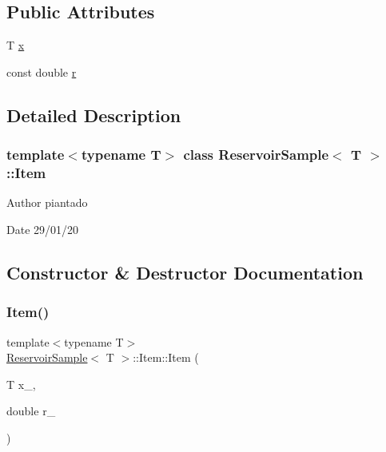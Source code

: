 \subsection*{Public Attributes}
\begin{DoxyCompactItemize}
\item 
T \hyperlink{struct_reservoir_sample_1_1_item_abc1ea374480d6d86d0466e4683c98337}{x}
\item 
const double \hyperlink{struct_reservoir_sample_1_1_item_ad74b6fb33eb3a534eeb4141c735dfaf5}{r}
\end{DoxyCompactItemize}


\subsection{Detailed Description}
\subsubsection*{template$<$typename T$>$\newline
class Reservoir\+Sample$<$ T $>$\+::\+Item}

\begin{DoxyAuthor}{Author}
piantado 
\end{DoxyAuthor}
\begin{DoxyDate}{Date}
29/01/20 
\end{DoxyDate}


\subsection{Constructor \& Destructor Documentation}
\mbox{\label{struct_reservoir_sample_1_1_item_a01a115a4bc68485d3349d61b85388998}} 
\subsubsection{\texorpdfstring{Item()}{Item()}}
{\footnotesize\ttfamily template$<$typename T$>$ \\
\hyperlink{class_reservoir_sample}{Reservoir\+Sample}$<$ T $>$\+::Item\+::\+Item (\begin{DoxyParamCaption}\item[{T}]{x\+\_\+,  }\item[{double}]{r\+\_\+ }\end{DoxyParamCaption})\hspace{0.3cm}{\ttfamily [inline]}}



